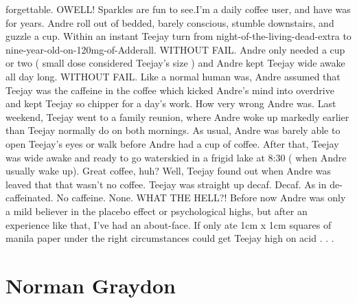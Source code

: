 \documentclass[12pt]{book}
\begin{document}
forgettable. OWELL! Sparkles are fun to see.I'm a daily coffee user, and have was for years. Andre roll out of bedded, barely conscious, stumble downstairs, and guzzle a cup. Within an instant Teejay turn from night-of-the-living-dead-extra to nine-year-old-on-120mg-of-Adderall. WITHOUT FAIL. Andre only needed a cup or two ( small dose considered Teejay's size ) and Andre kept Teejay wide awake all day long. WITHOUT FAIL. Like a normal human was, Andre assumed that Teejay was the caffeine in the coffee which kicked Andre's mind into overdrive and kept Teejay so chipper for a day's work. How very wrong Andre was. Last weekend, Teejay went to a family reunion, where Andre woke up markedly earlier than Teejay normally do on both mornings. As usual, Andre was barely able to open Teejay's eyes or walk before Andre had a cup of coffee. After that, Teejay was wide awake and ready to go waterskied in a frigid lake at 8:30 ( when Andre usually wake up). Great coffee, huh? Well, Teejay found out when Andre was leaved that that wasn't no coffee. Teejay was straight up decaf. Decaf. As in de-caffeinated. No caffeine. None. WHAT THE HELL?! Before now Andre was only a mild believer in the placebo effect or psychological highs, but after an experience like that, I've had an about-face. If only ate 1cm x 1cm squares of manila paper under the right circumstances could get Teejay high on acid . . . 



\chapter{Norman Graydon}
\end{document}
